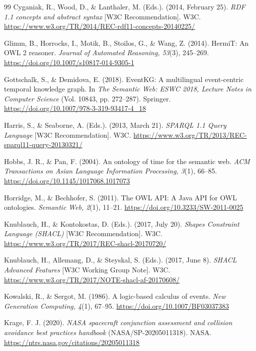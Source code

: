 \documentclass[Royal,sageh,times]{sagej}
\begin{document}
\begin{thebibliography}{99}
Cyganiak, R., Wood, D., \& Lanthaler, M. (Eds.). (2014, February 25). \textit{RDF 1.1 concepts and abstract syntax} [W3C Recommendation]. W3C. \url{https://www.w3.org/TR/2014/REC-rdf11-concepts-20140225/}

Glimm, B., Horrocks, I., Motik, B., Stoilos, G., \& Wang, Z. (2014). HermiT: An OWL 2 reasoner. \textit{Journal of Automated Reasoning, 53}(3), 245--269. \url{https://doi.org/10.1007/s10817-014-9305-1}

Gottschalk, S., \& Demidova, E. (2018). EventKG: A multilingual event-centric temporal knowledge graph. In \textit{The Semantic Web: ESWC 2018, Lecture Notes in Computer Science} (Vol. 10843, pp. 272--287). Springer. \url{https://doi.org/10.1007/978-3-319-93417-4_18}

Harris, S., \& Seaborne, A. (Eds.). (2013, March 21). \textit{SPARQL 1.1 Query Language} [W3C Recommendation]. W3C. \url{https://www.w3.org/TR/2013/REC-sparql11-query-20130321/}

Hobbs, J. R., \& Pan, F. (2004). An ontology of time for the semantic web. \textit{ACM Transactions on Asian Language Information Processing, 3}(1), 66--85. \url{https://doi.org/10.1145/1017068.1017073}

Horridge, M., \& Bechhofer, S. (2011). The OWL API: A Java API for OWL ontologies. \textit{Semantic Web, 2}(1), 11--21. \url{https://doi.org/10.3233/SW-2011-0025}

Knublauch, H., \& Kontokostas, D. (Eds.). (2017, July 20). \textit{Shapes Constraint Language (SHACL)} [W3C Recommendation]. W3C. \url{https://www.w3.org/TR/2017/REC-shacl-20170720/}

Knublauch, H., Allemang, D., \& Steyskal, S. (Eds.). (2017, June 8). \textit{SHACL Advanced Features} [W3C Working Group Note]. W3C. \url{https://www.w3.org/TR/2017/NOTE-shacl-af-20170608/}

Kowalski, R., \& Sergot, M. (1986). A logic-based calculus of events. \textit{New Generation Computing, 4}(1), 67--95. \url{https://doi.org/10.1007/BF03037383}

Krage, F. J. (2020). \textit{NASA spacecraft conjunction assessment and collision avoidance best practices handbook} (NASA/SP-20205011318). NASA. \url{https://ntrs.nasa.gov/citations/20205011318}


\end{thebibliography}
\end{document}
